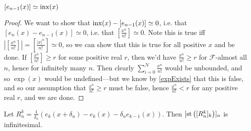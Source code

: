 \begin{lemma}\label{expDerivProofLemma1}
    $[e_{n-1}(x)] \simeq \operatorname{inx}(x)$
\end{lemma}
\begin{proof}
    We want to show that $\operatorname{inx}(x) - [e_{n-1}(x)] \simeq 0$, i.e. that $[e_n(x) - e_{n-1}(x)] \simeq 0$, i.e. that $[\frac{x^n}{n!}] \simeq 0$. Note this is true iff $|[\frac{x^n}{n!}]| = [\frac{|x|^n}{n!}] \simeq 0$, so we can show that this is true for all positive $x$ and be done. If $[\frac{x^n}{n!}] \geq r$ for some positive real $r$, then we'd have $\frac{x^n}{n!} \geq r$ for $\mathcal{F}$-almost all $n$, hence for infinitely many $n$. Then clearly $\sum_{i = 0}^\mathcal{N} \frac{x^n}{n!}$ would be unbounded, and so $\exp(x)$ would be undefined---but we know by \ref{expExists} that this is false, and so our assumption that $\frac{x^n}{n!} \geq r$ must be false, hence $\frac{x^n}{n!} < r$ for any positive real $r$, and we are done.
\end{proof}

\begin{lemma}\label{expDerivProofLemma2}
    Let $R_n^k = \frac{1}{\delta_n}(e_k(x + \delta_n) - e_k(x) - \delta_n e_{k-1}(x))$. Then $[\operatorname{st}\left([R_n^k]_k\right)]_n$ is infinitesimal.
\end{lemma}

